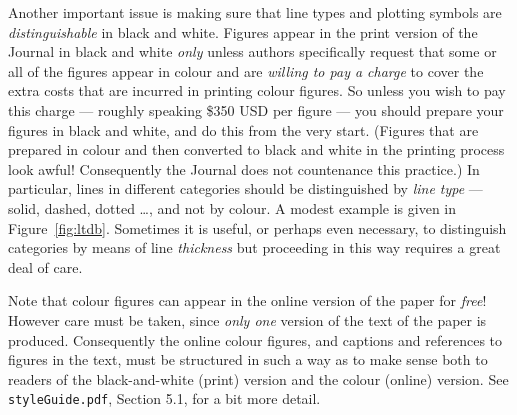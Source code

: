 \documentclass[times, doublespace]{anzsauth}
\begin{document}
Another important issue is making sure that line types and
plotting symbols are \emph{distinguishable} in black and white.
Figures appear in the print version of the Journal in black and
white \emph{only} unless authors specifically request that some or
all of the figures appear in colour and are \emph{willing to pay
a charge} to cover the extra costs that are incurred in printing
colour figures.  So unless you wish to pay this charge --- roughly
speaking \$350 USD per figure --- you should prepare your figures
in black and white, and do this from the very start. (Figures
that are prepared in colour and then converted to black and white
in the printing process look awful! Consequently the Journal
does not countenance this practice.)  In particular, lines in
different categories should be distinguished by \emph{line type}
--- solid, dashed, dotted \ldots, and not by colour.  A modest
example is given in Figure~\ref{fig:ltdb}.  Sometimes it is useful,
or perhaps even necessary, to distinguish categories by means of
line \emph{thickness} but proceeding in this way requires a great
deal of care.

Note that colour figures can appear in the online version of the
paper for \emph{free}!  However care must be taken, since \emph{only
one} version of the text of the paper is produced.  Consequently
the online colour figures, and captions and references to figures
in the text, must be structured in such a way as to make sense
both to readers of the black-and-white (print) version and the
colour (online) version.  See \texttt{styleGuide.pdf}, Section
5.1, for a bit more detail.
\end{document}
